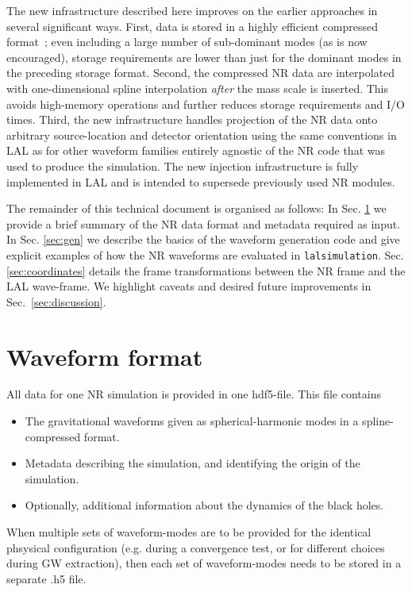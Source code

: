 \documentclass[11pt,tightenlines,article,amssymb,amsmath,amsfonts,superscriptaddress,nofootinbib]{revtex4}
\newcommand{\harald}[1]{\textcolor{Cerulean}{#1}}
\begin{document}
The new infrastructure described here improves on the earlier approaches
in several significant ways. First, data is stored in a highly efficient compressed format~\cite{Galley:2016mvy}; even including a large number of sub-dominant modes (as is now encouraged), storage requirements are lower than just for the dominant modes in the preceding storage format.  
Second, the compressed NR data are interpolated with one-dimensional spline interpolation \emph{after} the mass scale is inserted. This avoids high-memory operations and further reduces storage requirements and I/O times. Third, the new infrastructure handles projection of the NR data onto arbitrary source-location and detector orientation using the same conventions in LAL as for other waveform families entirely agnostic of the NR code that was used to produce the simulation. The new injection infrastructure is fully implemented in LAL and is intended to supersede previously used NR modules.

The remainder of this technical document is organised as follows: In Sec. \ref{sec:format} we provide a brief summary
of the NR data format and metadata required as input. In Sec. \ref{sec:gen} we describe the basics of the waveform generation code and give explicit examples of how the NR waveforms are evaluated in \texttt{lalsimulation}. Sec. \ref{sec:coordinates} details the frame transformations between the NR frame and the LAL wave-frame. We highlight caveats and desired future improvements in Sec.~\ref{sec:discussion}.

\section{Waveform format}
\label{sec:format}


\harald{All data for one NR simulation is provided in one hdf5-file.
  This file contains
  \begin{itemize}
    \item The gravitational waveforms given as spherical-harmonic
      modes in a spline-compressed format.
    \item Metadata describing the simulation, and identifying the
      origin of the simulation.
      \item Optionally, additional information about the dynamics of
        the black holes.
  \end{itemize}
When multiple sets of waveform-modes are to be provided for the
identical phsysical configuration (e.g. during a convergence test, or
for different choices during GW extraction), then each set of
waveform-modes needs to be stored in a separate .h5 file.}
\end{document}
